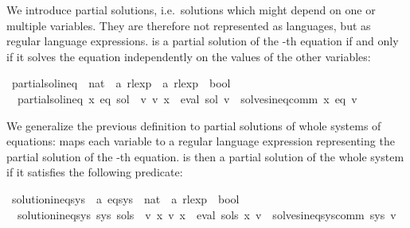 \begin{isabellebody}
{\isafoldproof}%
%
\isadelimproof
%
\endisadelimproof
%
\isadelimdocument
%
\endisadelimdocument
%
\isatagdocument
%
\isamarkuptrue%
%
\endisatagdocument
{\isafolddocument}%
%
\isadelimdocument
%
\endisadelimdocument
%
\begin{isamarkuptext}%
We introduce partial solutions, i.e.\ solutions which might depend on one or multiple
variables. They are therefore not represented as languages, but as regular language expressions.
 is a partial solution of the -th equation if and only if it solves the equation
independently on the values of the other variables:%
\end{isamarkuptext}\isamarkuptrue%
\isamarkupfalse%
\ partial{\isacharunderscore}{\kern0pt}sol{\isacharunderscore}{\kern0pt}ineq\ {\isacharcolon}{\kern0pt}{\isacharcolon}{\kern0pt}\ {\isachardoublequoteopen}nat\ {\isasymRightarrow}\ {\isacharprime}{\kern0pt}a\ rlexp\ {\isasymRightarrow}\ {\isacharprime}{\kern0pt}a\ rlexp\ {\isasymRightarrow}\ bool{\isachardoublequoteclose}\ \isanewline
\ \ {\isachardoublequoteopen}partial{\isacharunderscore}{\kern0pt}sol{\isacharunderscore}{\kern0pt}ineq\ x\ eq\ sol\ {\isasymequiv}\ {\isasymforall}v{\isachardot}{\kern0pt}\ v\ x\ {\isacharequal}{\kern0pt}\ eval\ sol\ v\ {\isasymlongrightarrow}\ solves{\isacharunderscore}{\kern0pt}ineq{\isacharunderscore}{\kern0pt}comm\ x\ eq\ v{\isachardoublequoteclose}%
\begin{isamarkuptext}%
We generalize the previous definition to partial solutions of whole systems of equations:
 maps each variable  to a regular language expression representing the partial solution
of the -th equation.  is then a partial solution of the whole system if it satisfies the
following predicate:%
\end{isamarkuptext}\isamarkuptrue%
\isamarkupfalse%
\ solution{\isacharunderscore}{\kern0pt}ineq{\isacharunderscore}{\kern0pt}sys\ {\isacharcolon}{\kern0pt}{\isacharcolon}{\kern0pt}\ {\isachardoublequoteopen}{\isacharprime}{\kern0pt}a\ eq{\isacharunderscore}{\kern0pt}sys\ {\isasymRightarrow}\ {\isacharparenleft}{\kern0pt}nat\ {\isasymRightarrow}\ {\isacharprime}{\kern0pt}a\ rlexp{\isacharparenright}{\kern0pt}\ {\isasymRightarrow}\ bool{\isachardoublequoteclose}\ \isanewline
\ \ {\isachardoublequoteopen}solution{\isacharunderscore}{\kern0pt}ineq{\isacharunderscore}{\kern0pt}sys\ sys\ sols\ {\isasymequiv}\ {\isasymforall}v{\isachardot}{\kern0pt}\ {\isacharparenleft}{\kern0pt}{\isasymforall}x{\isachardot}{\kern0pt}\ v\ x\ {\isacharequal}{\kern0pt}\ eval\ {\isacharparenleft}{\kern0pt}sols\ x{\isacharparenright}{\kern0pt}\ v{\isacharparenright}{\kern0pt}\ {\isasymlongrightarrow}\ solves{\isacharunderscore}{\kern0pt}ineq{\isacharunderscore}{\kern0pt}sys{\isacharunderscore}{\kern0pt}comm\ sys\ v{\isachardoublequoteclose}%

\end{isabellebody}
